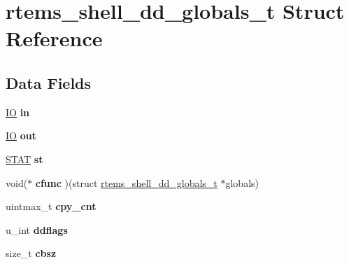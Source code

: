 \hypertarget{structrtems__shell__dd__globals__t}{}\section{rtems\+\_\+shell\+\_\+dd\+\_\+globals\+\_\+t Struct Reference}
\label{structrtems__shell__dd__globals__t}
\subsection*{Data Fields}
\begin{DoxyCompactItemize}
\item 
\mbox{\label{structrtems__shell__dd__globals__t_afbc151710f0ee06dd1fc2bb7829d924d}} 
\mbox{\hyperlink{structIO}{IO}} {\bfseries in}
\item 
\mbox{\label{structrtems__shell__dd__globals__t_a893c79cf7d299ffa8068b6b1bc7a50ba}} 
\mbox{\hyperlink{structIO}{IO}} {\bfseries out}
\item 
\mbox{\label{structrtems__shell__dd__globals__t_aa3d10e8b2a62a65ea7c472d19f54e161}} 
\mbox{\hyperlink{structSTAT}{S\+T\+AT}} {\bfseries st}
\item 
\mbox{\label{structrtems__shell__dd__globals__t_a79ba0975b0f848b63a83bbb8c9d271ac}} 
void($\ast$ {\bfseries cfunc} )(struct \mbox{\hyperlink{structrtems__shell__dd__globals__t}{rtems\+\_\+shell\+\_\+dd\+\_\+globals\+\_\+t}} $\ast$globals)
\item 
\mbox{\label{structrtems__shell__dd__globals__t_a1e43e63422fa08076e92168407d37f4a}} 
uintmax\+\_\+t {\bfseries cpy\+\_\+cnt}
\item 
\mbox{\label{structrtems__shell__dd__globals__t_a4eb973d1120d53162d64150714003338}} 
u\+\_\+int {\bfseries ddflags}
\item 
\mbox{\label{structrtems__shell__dd__globals__t_adec03bee333ea4a9b37b8a34f19d80b1}} 
size\+\_\+t {\bfseries cbsz}
\item 
\mbox{\label{structrtems__shell__dd__globals__t_a3d54963157c9b059cf5182b24f8995f0}} 

\end{DoxyCompactItemize}
